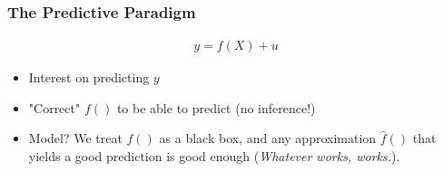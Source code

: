 \documentclass[
  shownotes,
  xcolor={svgnames},
  hyperref={colorlinks,citecolor=DarkBlue,linkcolor=andesred,urlcolor=DarkBlue}
  , aspectratio=169]{beamer}
\begin{document}
\begin{frame}
\frametitle{The Predictive Paradigm}


\begin{align}
y=f(X)+u
\end{align}

\begin{itemize}
  \item Interest on predicting $y$
  \medskip
  \item "Correct" $f()$ to be able to predict (no inference!)
  \medskip
  \item Model? We  treat $f()$ as a black box, and any approximation $\hat{f}()$ that yields a good prediction is good enough ({\it Whatever works, works.}).

\end{itemize}


\end{frame}
\end{document}
